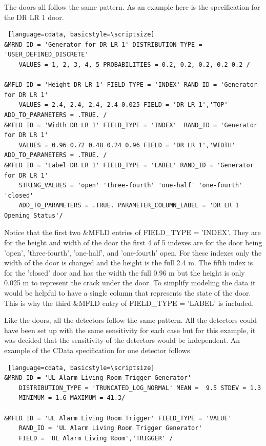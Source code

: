 \documentclass[12pt,twoside]{book}
\begin{document}
The doors all follow the same pattern. As an example here is the specification for the DR LR 1 door.

\vspace{\baselineskip}
\begin{lstlisting} [language=cdata, basicstyle=\scriptsize]
&MRND ID = 'Generator for DR LR 1' DISTRIBUTION_TYPE = 'USER_DEFINED_DISCRETE'
	VALUES = 1, 2, 3, 4, 5 PROBABILITIES = 0.2, 0.2, 0.2, 0.2 0.2 /

&MFLD ID = 'Height DR LR 1' FIELD_TYPE = 'INDEX' RAND_ID = 'Generator for DR LR 1'
	VALUES = 2.4, 2.4, 2.4, 2.4 0.025 FIELD = 'DR LR 1','TOP' ADD_TO_PARAMETERS = .TRUE. /
&MFLD ID = 'Width DR LR 1' FIELD_TYPE = 'INDEX'  RAND_ID = 'Generator for DR LR 1'
	VALUES = 0.96 0.72 0.48 0.24 0.96 FIELD = 'DR LR 1','WIDTH' ADD_TO_PARAMETERS = .TRUE. /
&MFLD ID = 'Label DR LR 1' FIELD_TYPE = 'LABEL' RAND_ID = 'Generator for DR LR 1'
	STRING_VALUES = 'open' 'three-fourth' 'one-half' 'one-fourth' 'closed'
	ADD_TO_PARAMETERS = .TRUE. PARAMETER_COLUMN_LABEL = 'DR LR 1 Opening Status'/
\end{lstlisting}

Notice that the first two  {\ct \&MFLD} entries of  {\ct FIELD\_TYPE = 'INDEX'}. They are for the height and width of the door the first 4 of 5 indexes are for the door being 'open', 'three-fourth', 'one-half', and  'one-fourth' open. For these indexes only the width of the door is changed and the height is the full 2.4 m. The fifth index is for the 'closed' door and has the width the full 0.96 m but the height is only 0.025 m to represent the crack under the door. To simplify modeling the data it would be helpful to have a single column that represents the state of the door. This is why the third {\ct \&MFLD} entry of {\ct FIELD\_TYPE = 'LABEL'} is included.

Like the doors, all the detectors follow the same pattern. All the detectors could have been set up with the same sensitivity for each case but for this example, it was decided that the sensitivity of the detectors would be independent. An example of the CData specification for one detector follows

\vspace{\baselineskip}
\begin{lstlisting} [language=cdata, basicstyle=\scriptsize]
&MRND ID = 'UL Alarm Living Room Trigger Generator'
	DISTRIBUTION_TYPE = 'TRUNCATED_LOG_NORMAL' MEAN =  9.5 STDEV = 1.3
	MINIMUM = 1.6 MAXIMUM = 41.3/
	
&MFLD ID = 'UL Alarm Living Room Trigger' FIELD_TYPE = 'VALUE'
	RAND_ID = 'UL Alarm Living Room Trigger Generator'
    FIELD = 'UL Alarm Living Room','TRIGGER' /
\end{lstlisting}
\end{document}
